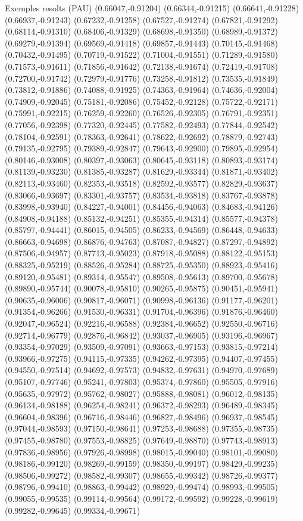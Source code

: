 \documentclass[11pt,a4paper]{article}
\begin{document}
\begin{fmex}{Exemples resolts (PAU)}
(0.66047,-0.91204) (0.66344,-0.91215) (0.66641,-0.91228) (0.66937,-0.91243) (0.67232,-0.91258) (0.67527,-0.91274) (0.67821,-0.91292) (0.68114,-0.91310) (0.68406,-0.91329) (0.68698,-0.91350) (0.68989,-0.91372) (0.69279,-0.91394) (0.69569,-0.91418) (0.69857,-0.91443) (0.70145,-0.91468) (0.70432,-0.91495) (0.70719,-0.91522) (0.71004,-0.91551) (0.71289,-0.91580) (0.71573,-0.91611) (0.71856,-0.91642) (0.72138,-0.91674) (0.72419,-0.91708) (0.72700,-0.91742) (0.72979,-0.91776) (0.73258,-0.91812) (0.73535,-0.91849) (0.73812,-0.91886) (0.74088,-0.91925) (0.74363,-0.91964) (0.74636,-0.92004) (0.74909,-0.92045) (0.75181,-0.92086) (0.75452,-0.92128) (0.75722,-0.92171) (0.75991,-0.92215) (0.76259,-0.92260) (0.76526,-0.92305) (0.76791,-0.92351) (0.77056,-0.92398) (0.77320,-0.92445) (0.77582,-0.92493) (0.77844,-0.92542) (0.78104,-0.92591) (0.78363,-0.92641) (0.78622,-0.92692) (0.78879,-0.92743) (0.79135,-0.92795) (0.79389,-0.92847) (0.79643,-0.92900) (0.79895,-0.92954) (0.80146,-0.93008) (0.80397,-0.93063) (0.80645,-0.93118) (0.80893,-0.93174) (0.81139,-0.93230) (0.81385,-0.93287) (0.81629,-0.93344) (0.81871,-0.93402) (0.82113,-0.93460) (0.82353,-0.93518) (0.82592,-0.93577) (0.82829,-0.93637) (0.83066,-0.93697) (0.83301,-0.93757) (0.83534,-0.93818) (0.83767,-0.93878) (0.83998,-0.93940) (0.84227,-0.94001) (0.84456,-0.94063) (0.84683,-0.94126) (0.84908,-0.94188) (0.85132,-0.94251) (0.85355,-0.94314) (0.85577,-0.94378) (0.85797,-0.94441) (0.86015,-0.94505) (0.86233,-0.94569) (0.86448,-0.94633) (0.86663,-0.94698) (0.86876,-0.94763) (0.87087,-0.94827) (0.87297,-0.94892) (0.87506,-0.94957) (0.87713,-0.95023) (0.87918,-0.95088) (0.88122,-0.95153) (0.88325,-0.95219) (0.88526,-0.95284) (0.88725,-0.95350) (0.88923,-0.95416) (0.89120,-0.95481) (0.89314,-0.95547) (0.89508,-0.95613) (0.89700,-0.95678) (0.89890,-0.95744) (0.90078,-0.95810) (0.90265,-0.95875) (0.90451,-0.95941) (0.90635,-0.96006) (0.90817,-0.96071) (0.90998,-0.96136) (0.91177,-0.96201) (0.91354,-0.96266) (0.91530,-0.96331) (0.91704,-0.96396) (0.91876,-0.96460) (0.92047,-0.96524) (0.92216,-0.96588) (0.92384,-0.96652) (0.92550,-0.96716) (0.92714,-0.96779) (0.92876,-0.96842) (0.93037,-0.96905) (0.93196,-0.96967) (0.93354,-0.97029) (0.93509,-0.97091) (0.93663,-0.97153) (0.93815,-0.97214) (0.93966,-0.97275) (0.94115,-0.97335) (0.94262,-0.97395) (0.94407,-0.97455) (0.94550,-0.97514) (0.94692,-0.97573) (0.94832,-0.97631) (0.94970,-0.97689) (0.95107,-0.97746) (0.95241,-0.97803) (0.95374,-0.97860) (0.95505,-0.97916) (0.95635,-0.97972) (0.95762,-0.98027) (0.95888,-0.98081) (0.96012,-0.98135) (0.96134,-0.98188) (0.96254,-0.98241) (0.96372,-0.98293) (0.96489,-0.98345) (0.96604,-0.98396) (0.96716,-0.98446) (0.96827,-0.98496) (0.96937,-0.98545) (0.97044,-0.98593) (0.97150,-0.98641) (0.97253,-0.98688) (0.97355,-0.98735) (0.97455,-0.98780) (0.97553,-0.98825) (0.97649,-0.98870) (0.97743,-0.98913) (0.97836,-0.98956) (0.97926,-0.98998) (0.98015,-0.99040) (0.98101,-0.99080) (0.98186,-0.99120) (0.98269,-0.99159) (0.98350,-0.99197) (0.98429,-0.99235) (0.98506,-0.99272) (0.98582,-0.99307) (0.98655,-0.99342) (0.98726,-0.99377) (0.98796,-0.99410) (0.98863,-0.99442) (0.98929,-0.99474) (0.98993,-0.99505) (0.99055,-0.99535) (0.99114,-0.99564) (0.99172,-0.99592) (0.99228,-0.99619) (0.99282,-0.99645) (0.99334,-0.99671) 
\end{fmex}
\end{document}
